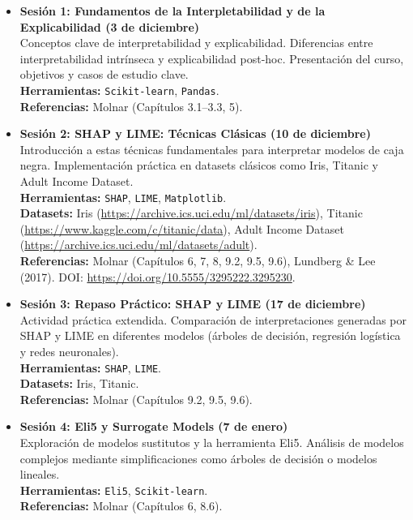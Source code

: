 \begin{itemize}
    \item \textbf{Sesión 1: Fundamentos de la Interpletabilidad y de la Explicabilidad (3 de diciembre)}\\
    Conceptos clave de interpretabilidad y explicabilidad. Diferencias entre interpretabilidad intrínseca y explicabilidad post-hoc. Presentación del curso, objetivos y casos de estudio clave.\\
    \textbf{Herramientas:} \texttt{Scikit-learn}, \texttt{Pandas}.\\
    \textbf{Referencias:} Molnar (Capítulos 3.1–3.3, 5).

    \item \textbf{Sesión 2: SHAP y LIME: Técnicas Clásicas (10 de diciembre)}\\
    Introducción a estas técnicas fundamentales para interpretar modelos de caja negra. Implementación práctica en datasets clásicos como Iris, Titanic y Adult Income Dataset.\\
    \textbf{Herramientas:} \texttt{SHAP}, \texttt{LIME}, \texttt{Matplotlib}.\\
    \textbf{Datasets:} Iris (\url{https://archive.ics.uci.edu/ml/datasets/iris}), Titanic (\url{https://www.kaggle.com/c/titanic/data}), Adult Income Dataset (\url{https://archive.ics.uci.edu/ml/datasets/adult}).\\
    \textbf{Referencias:} Molnar (Capítulos 6, 7, 8, 9.2, 9.5, 9.6), Lundberg \& Lee (2017). DOI: \url{https://doi.org/10.5555/3295222.3295230}.

    \item \textbf{Sesión 3: Repaso Práctico: SHAP y LIME (17 de diciembre)}\\
    Actividad práctica extendida. Comparación de interpretaciones generadas por SHAP y LIME en diferentes modelos (árboles de decisión, regresión logística y redes neuronales).\\
    \textbf{Herramientas:} \texttt{SHAP}, \texttt{LIME}.\\
    \textbf{Datasets:} Iris, Titanic.\\
    \textbf{Referencias:} Molnar (Capítulos 9.2, 9.5, 9.6).

    \item \textbf{Sesión 4: Eli5 y Surrogate Models (7 de enero)}\\
    Exploración de modelos sustitutos y la herramienta Eli5. Análisis de modelos complejos mediante simplificaciones como árboles de decisión o modelos lineales.\\
    \textbf{Herramientas:} \texttt{Eli5}, \texttt{Scikit-learn}.\\
    \textbf{Referencias:} Molnar (Capítulos 6, 8.6).


\end{itemize}
